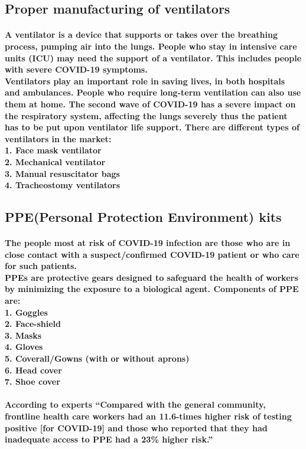 \documentclass{article}
\begin{document}
	\subsection{\textbf{Proper manufacturing of ventilators}}
	\paragraph{A ventilator is a device that supports or takes over the breathing process, pumping air into the lungs. People who stay in intensive care units (ICU) may need the support of a ventilator. This includes people with severe COVID-19 symptoms.\\
	Ventilators play an important role in saving lives, in both hospitals and ambulances. People who require long-term ventilation can also use them at home. The second wave of COVID-19 has a severe impact on the respiratory system, affecting the lungs severely thus the patient has to be put upon ventilator life support. There are different types of ventilators in the market:
	\\1. Face mask ventilator
	\\2. Mechanical ventilator
	\\3. Manual resuscitator bags
	\\4. Tracheostomy ventilators}
	\subsection{\textbf{PPE(Personal Protection Environment) kits}}
	\paragraph{The people most at risk of COVID-19 infection are those who are in close contact with a suspect/confirmed COVID-19 patient or who care for such patients.\\
	PPEs are protective gears designed to safeguard the health of workers by minimizing the exposure to a biological agent. Components of PPE are:
	\\1. Goggles 
	\\2. Face-shield 
	\\3. Masks
	\\4. Gloves 
	\\5. Coverall/Gowns (with or without aprons) 
	\\6. Head cover 
	\\7. Shoe cover\\\\
	According to experts “Compared with the general community, frontline health care workers had an 11.6-times higher risk of testing positive [for COVID-19] and those who reported that they had inadequate access to PPE had a 23\% higher risk.”}
\end{document}
